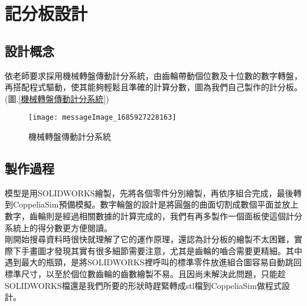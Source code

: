 \chapter{記分板設計}
\section{設計概念}
    依老師要求採用機械轉盤傳動計分系統，由齒輪帶動個位數及十位數的數字轉盤，再搭配程式驅動，使其能夠輕鬆且準確的計算分數，圖為我們自己製作的計分板。(圖.\ref{機械轉盤傳動計分系統})\\
    
\begin{figure}[hbt!]
\center
\texttt{[image: messageImage\_1685927228163]}
\caption{\Large 機械轉盤傳動計分系統}
\label{messageImage_1685927228163}
\end{figure}
    
\section{製作過程}

模型是用SOLIDWORKS繪製，先將各個零件分別繪製，再依序組合完成，最後轉到CoppeliaSim預備模擬。數字輪盤的設計是將圓盤的曲面切割成數個平面並放上數字，齒輪則是經過相關數據的計算完成的，我們有再多製作一個面板使這個計分系統上的得分數更方便閱讀。\\
剛開始搜尋資料時很快就理解了它的運作原理，還認為計分板的繪製不太困難，實際下手畫圖才發現其實有很多細節需要注意，尤其是齒輪的嚙合需要更精細。其中遇到最大的瓶頸，是將SOLIDWORKS裡呼叫的標準零件放進組合圖容易自動跳回標準尺寸，以至於個位數齒輪的齒數繪製不易。且因尚未解決此問題，只能趁SOLIDWORKS檔還是我們所要的形狀時趕緊轉成stl檔到CoppeliaSim做程式設計。\\







